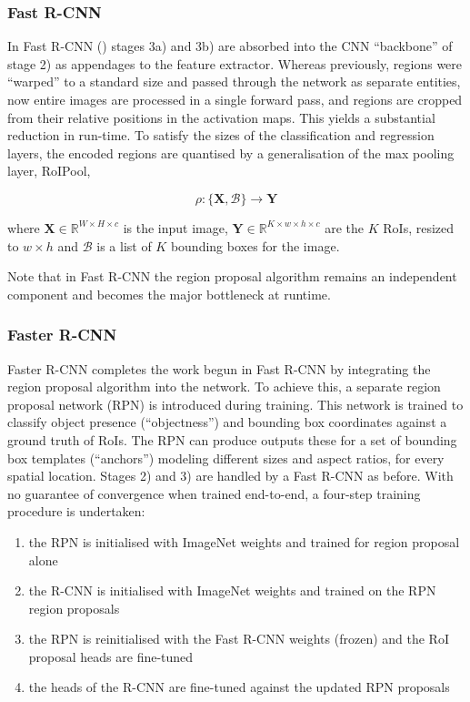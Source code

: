 \subsubsection{Fast R-CNN}

In Fast R-CNN (\cite{girshick2015fast}) stages 3a) and 3b) are absorbed into the CNN ``backbone'' of stage 2) as appendages to the feature extractor. Whereas previously, regions were ``warped'' to a standard size and passed through the network as separate entities, now entire images are processed in a single forward pass, and regions are cropped from their relative positions in the activation maps. This yields a substantial reduction in run-time. To satisfy the sizes of the classification and regression layers, the encoded regions are quantised by a generalisation of the max pooling layer, RoIPool,

$$\rho : \{\mathbf{X}, \mathcal{B}\} \to \mathbf{Y}$$

where $\mathbf{X} \in \mathbb{R}^{W \times H \times c}$ is the input image, $\mathbf{Y} \in \mathbb{R}^{K \times w \times h \times c}$ are the $K$ RoIs, resized to $w \times h$ and $\mathcal{B}$ is a list of $K$ bounding boxes for the image.

Note that in Fast R-CNN the region proposal algorithm remains an independent component and becomes the major bottleneck at runtime.

\subsubsection{Faster R-CNN}

Faster R-CNN \cite{ren2015faster} completes the work begun in Fast R-CNN by integrating the region proposal algorithm into the network. To achieve this, a separate region proposal network (RPN) is introduced during training. This network is trained to classify object presence (``objectness'') and bounding box coordinates against a ground truth of RoIs. The RPN can produce outputs these for a set of bounding box templates (``anchors'') modeling different sizes and aspect ratios, for every spatial location. Stages 2) and 3) are handled by a Fast R-CNN as before. With no guarantee of convergence when trained end-to-end, a four-step training procedure is undertaken:

\begin{enumerate}
\item the RPN is initialised with ImageNet weights and trained for region proposal alone
\item the R-CNN is initialised with ImageNet weights and trained on the RPN region proposals
\item the RPN is reinitialised with the Fast R-CNN weights (frozen) and the RoI proposal heads are fine-tuned
\item the heads of the R-CNN are fine-tuned against the updated RPN proposals
\end{enumerate}

